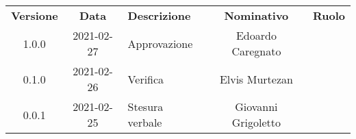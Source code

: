{
    \renewcommand{\arraystretch}{1.5}
    \centering
    \begin{longtable}{ c c  C{4cm}  c  c }
        \rowcolor{\primaryColor}
        \textcolor{\secondaryColor}{
        \textbf{Versione}}     & \textcolor{\secondaryColor}{\textbf{Data}}       & \textcolor{\secondaryColor}
        {\textbf{Descrizione}} & \textcolor{\secondaryColor}{\textbf{Nominativo}} & \textcolor{\secondaryColor}{\textbf{Ruolo}}                          \\


        1.0.0                  & 2021-02-27                                       & Approvazione                                & Edoardo Caregnato & \responsabile{} \\
        0.1.0                  & 2021-02-26                                       & Verifica                                    & Elvis Murtezan & \verificatore{} \\
        0.0.1                  & 2021-02-25                                       & Stesura verbale                           & Giovanni Grigoletto & \redattore{}    \\
    \end{longtable}
}